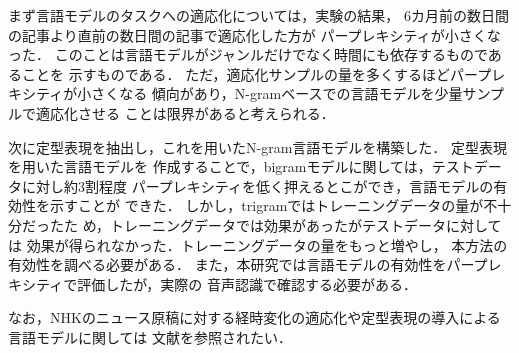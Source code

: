  まず言語モデルのタスクへの適応化については，実験の結果，
 6カ月前の数日間の記事より直前の数日間の記事で適応化した方が
 パープレキシティが小さくなった．
 このことは言語モデルがジャンルだけでなく時間にも依存するものであることを
 示すものである．
 ただ，適応化サンプルの量を多くするほどパープレキシティが小さくなる
 傾向があり，N-gramベースでの言語モデルを少量サンプルで適応化させる
 ことは限界があると考えられる．

次に定型表現を抽出し，これを用いたN-gram言語モデルを構築した．
定型表現を用いた言\mbox{語モデルを}
作成することで，bigramモデルに関しては，テストデータに対し約3割程度
\mbox{パープレ}キシティを低く押えるとこができ，言語モデルの有効性を示すことが
できた．
しかし，trigramではトレーニングデータの量が不十分だったた
め，トレーニングデータでは効果があったがテストデータに対しては
効果が得られなかった．トレーニングデータの量をもっと増やし，
本方法の有効性を調べる必要がある．
また，本研究では言語モデルの有効性をパープレキシティで評価したが，実際の
音声認識で確認する必要がある\cite{akamatsu}．

なお，NHKのニュース原稿に対する経時変化の適応化や定型表現の導入による言語モデルに関しては
文献\cite{nhk,test24}を参照されたい．



